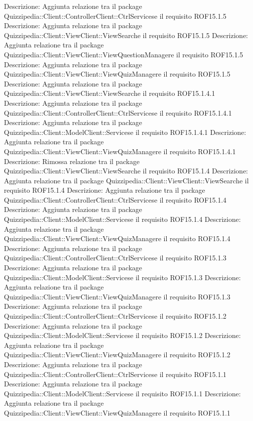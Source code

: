 Descrizione: Aggiunta relazione tra il package Quizzipedia::Client::ControllerClient::CtrlServicese il requisito ROF15.1.5 
Descrizione: Aggiunta relazione tra il package Quizzipedia::Client::ViewClient::ViewSearche il requisito ROF15.1.5 
Descrizione: Aggiunta relazione tra il package Quizzipedia::Client::ViewClient::ViewQuestionManagere il requisito ROF15.1.5 
Descrizione: Aggiunta relazione tra il package Quizzipedia::Client::ViewClient::ViewQuizManagere il requisito ROF15.1.5 
Descrizione: Aggiunta relazione tra il package Quizzipedia::Client::ViewClient::ViewSearche il requisito ROF15.1.4.1 
Descrizione: Aggiunta relazione tra il package Quizzipedia::Client::ControllerClient::CtrlServicese il requisito ROF15.1.4.1 
Descrizione: Aggiunta relazione tra il package Quizzipedia::Client::ModelClient::Servicese il requisito ROF15.1.4.1 
Descrizione: Aggiunta relazione tra il package Quizzipedia::Client::ViewClient::ViewQuizManagere il requisito ROF15.1.4.1 
Descrizione: Rimossa relazione tra il package Quizzipedia::Client::ViewClient::ViewSearche il requisito ROF15.1.4 
Descrizione: Aggiunta relazione tra il package Quizzipedia::Client::ViewClient::ViewSearche il requisito ROF15.1.4 
Descrizione: Aggiunta relazione tra il package Quizzipedia::Client::ControllerClient::CtrlServicese il requisito ROF15.1.4 
Descrizione: Aggiunta relazione tra il package Quizzipedia::Client::ModelClient::Servicese il requisito ROF15.1.4 
Descrizione: Aggiunta relazione tra il package Quizzipedia::Client::ViewClient::ViewQuizManagere il requisito ROF15.1.4 
Descrizione: Aggiunta relazione tra il package Quizzipedia::Client::ControllerClient::CtrlServicese il requisito ROF15.1.3 
Descrizione: Aggiunta relazione tra il package Quizzipedia::Client::ModelClient::Servicese il requisito ROF15.1.3 
Descrizione: Aggiunta relazione tra il package Quizzipedia::Client::ViewClient::ViewQuizManagere il requisito ROF15.1.3 
Descrizione: Aggiunta relazione tra il package Quizzipedia::Client::ControllerClient::CtrlServicese il requisito ROF15.1.2 
Descrizione: Aggiunta relazione tra il package Quizzipedia::Client::ModelClient::Servicese il requisito ROF15.1.2 
Descrizione: Aggiunta relazione tra il package Quizzipedia::Client::ViewClient::ViewQuizManagere il requisito ROF15.1.2 
Descrizione: Aggiunta relazione tra il package Quizzipedia::Client::ControllerClient::CtrlServicese il requisito ROF15.1.1 
Descrizione: Aggiunta relazione tra il package Quizzipedia::Client::ModelClient::Servicese il requisito ROF15.1.1 
Descrizione: Aggiunta relazione tra il package Quizzipedia::Client::ViewClient::ViewQuizManagere il requisito ROF15.1.1 
